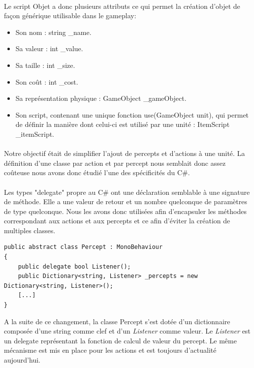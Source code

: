 \documentclass{report}
\begin{document}
\paragraph{}Le script Objet a donc plusieurs attributs ce qui permet la création d'objet de façon générique utilisable dans le gameplay:
\begin{itemize}
\item Son nom : string \_name.
\item Sa valeur : int \_value.
\item Sa taille : int \_size.
\item Son coût : int \_cost.
\item Sa représentation physique : GameObject \_gameObject.
\item Son script, contenant une unique fonction use(GameObject unit), qui permet de définir la manière dont celui-ci est utilisé par une unité : ItemScript \_itemScript.
\end{itemize}

\paragraph{}
Notre objectif était de simplifier l'ajout de percepts et d'actions à une unité. La définition d'une classe par action et par percept nous semblait donc assez coûteuse nous avons donc étudié l'une des spécificités du C\#.
\paragraph{}
Les types "delegate" propre au C\# ont une déclaration semblable à une signature de méthode.
Elle a une valeur de retour et un nombre quelconque de paramètres de type quelconque.
Nous les avons donc utilisées afin d'encapsuler les méthodes correspondant aux actions et aux percepts et ce afin d'éviter la création de multiples classes.

\begin{lstlisting}[language={[Sharp]C},label={lst:PerceptScript}, caption=  Extrait du code du script Percept.cs]
public abstract class Percept : MonoBehaviour
{
    public delegate bool Listener();
    public Dictionary<string, Listener> _percepts = new Dictionary<string, Listener>();
    [...]
}
\end{lstlisting}

A la suite de ce changement, la classe Percept s'est dotée d'un dictionnaire composée d'une string comme clef et d'un \textit{Listener} comme valeur. Le \textit{Listener} est un delegate représentant la fonction de calcul de valeur du percept. Le même mécanisme est mis en place pour les actions et est toujours d'actualité aujourd'hui.
\end{document}
